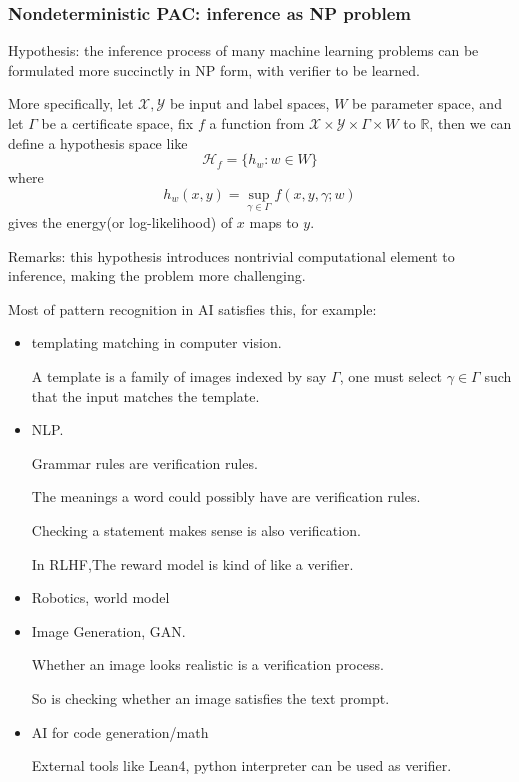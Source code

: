 \documentclass{beamer}   	%
\theoremstyle{definition}
\begin{document}
\begin{frame}
\frametitle{Nondeterministic PAC: inference as NP problem}
Hypothesis: the inference process of many machine learning problems can be formulated more succinctly in NP form, with verifier to be learned.

More specifically, let $\mathcal{X}, \mathcal{Y}$ be input and label spaces, $W$ be parameter space, and let $\Gamma$ be a certificate space, fix $f$ a function from $\mathcal{X}\times \mathcal{Y}\times \Gamma\times W$ to $\mathbb{R}$, then we can define a hypothesis space like
\begin{equation}
	\mathcal{H}_f=\{h_w: w\in W\}
\end{equation}
where
\begin{equation}
	h_w(x,y)=\sup_{\gamma\in \Gamma} f(x,y,\gamma;w)
\end{equation}
gives the energy(or log-likelihood) of $x$ maps to $y$.

\mbox{}

Remarks: this hypothesis introduces nontrivial computational element to inference, making the problem more challenging.
\end{frame}

\begin{frame}
Most of pattern recognition in AI satisfies this, for example:
\begin{itemize}
	\item templating matching in computer vision.

	A template is a family of images indexed by say $\Gamma$, one must select $\gamma\in \Gamma$ such that the input matches the template.
	\item NLP.

	Grammar rules are verification rules.

	The meanings a word could possibly have are verification rules.

	Checking a statement makes sense is also verification.

	In RLHF,The reward model is kind of like a verifier.
	\item Robotics, world model
	\item Image Generation, GAN.

	Whether an image looks realistic is a verification process.

	So is checking whether an image satisfies the text prompt.
	\item AI for code generation/math

	External tools like Lean4, python interpreter can be used as verifier.
\end{itemize}
\end{frame}
\end{document}
